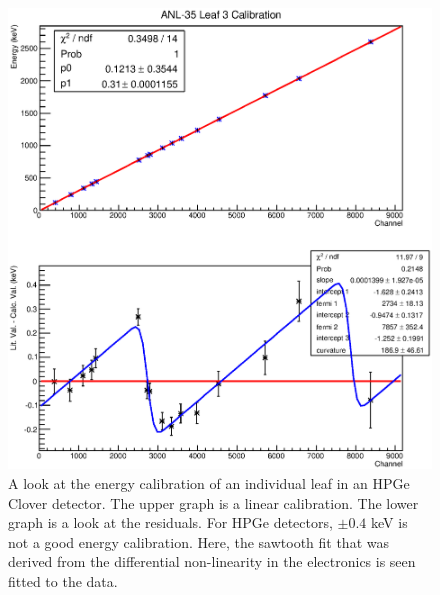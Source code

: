 \begin{figure}
    \centering
    \includegraphics[scale=0.7]{Setup_Figs/Clover_res_cal.eps}
    \caption{A look at the energy calibration of an individual leaf in an HPGe Clover detector. The upper graph is a linear calibration. The lower graph is a look at the residuals. For HPGe detectors, $\pm0.4$ keV is not a good energy calibration. Here, the sawtooth fit that was derived from the differential non-linearity in the electronics is seen fitted to the data.}
    \label{fig:Clover_ene_res}
\end{figure}